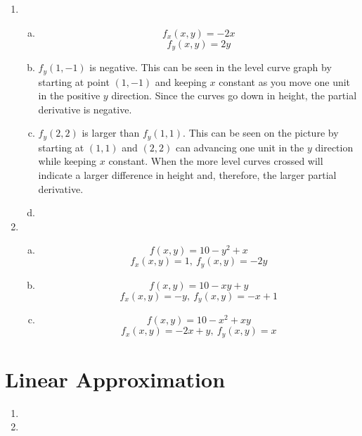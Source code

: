 \documentclass{article}
\begin{document}
\begin{enumerate}[1.]
  \item \begin{enumerate}[a.]
      \item $$ f_{x}(x, y) = -2x $$
        $$ f_{y}(x, y) = 2y $$
      \item $f_{y}(1, -1)$ is negative. This can be seen in the level curve
        graph by starting at point $(1, -1)$ and keeping $x$ constant as you
        move one unit in the positive $y$ direction. Since the curves go down in
        height, the partial derivative is negative.
      \item $f_{y}(2, 2)$ is larger than $f_{y}(1, 1)$. This can be seen on the
        picture by starting at $(1, 1)$ and $(2, 2)$ can advancing one unit in
        the $y$ direction while keeping $x$ constant. When the more level curves
        crossed will indicate a larger difference in height and, therefore, the
        larger partial derivative.
      \item
    \end{enumerate}
  \item \begin{enumerate}[a.]
    \item $$ f(x, y) = 10 - y^{2} + x $$
      $$ f_{x}(x, y) = 1,\ f_{y}(x, y) = -2y $$
    \item $$ f(x, y) = 10 - xy + y $$
      $$ f_{x}(x, y) = -y,\ f_{y}(x, y) = -x + 1 $$
    \item $$ f(x, y) = 10 - x^{2} + xy $$
      $$ f_{x}(x, y) = -2x + y,\ f_{y}(x, y) = x $$
  \end{enumerate}
\end{enumerate}

\section{Linear Approximation}

\begin{enumerate}[1.]
  \item
  \item
\end{enumerate}
\end{document}
